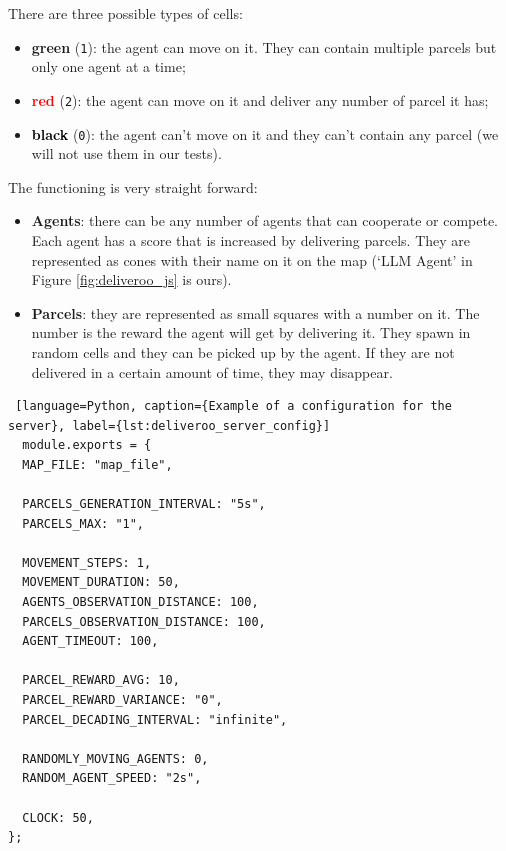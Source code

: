 There are three possible types of cells:
\begin{itemize}
  \item \textcolor{primary}{\textbf{green}} (\texttt{1}): the agent can move on
    it. They can contain multiple parcels but only one agent at a time;

  \item \textcolor{red}{\textbf{red}} (\texttt{2}): the agent can move on it and
    deliver any number of parcel it has;

  \item \textcolor{black}{\textbf{black}} (\texttt{0}): the agent can't move on
    it and they can't contain any parcel (we will not use them in our tests).
\end{itemize}

The functioning is very straight forward:

\begin{itemize}
  \item \textbf{Agents}: there can be any number of agents that can cooperate or
    compete. Each agent has a score that is increased by delivering parcels. They
    are represented as cones with their name on it on the map (`LLM Agent' in
    Figure \ref{fig:deliveroo_js} is ours).

  \item \textbf{Parcels}: they are represented as small squares with a number on
    it. The number is the reward the agent will get by delivering it. They spawn
    in random cells and they can be picked up by the agent. If they are not
    delivered in a certain amount of time, they may disappear.
\end{itemize}

\begin{lstlisting} [language=Python, caption={Example of a configuration for the server}, label={lst:deliveroo_server_config}]
  module.exports = {
  MAP_FILE: "map_file",

  PARCELS_GENERATION_INTERVAL: "5s",
  PARCELS_MAX: "1",

  MOVEMENT_STEPS: 1,
  MOVEMENT_DURATION: 50,
  AGENTS_OBSERVATION_DISTANCE: 100,
  PARCELS_OBSERVATION_DISTANCE: 100,
  AGENT_TIMEOUT: 100,

  PARCEL_REWARD_AVG: 10,
  PARCEL_REWARD_VARIANCE: "0",
  PARCEL_DECADING_INTERVAL: "infinite",

  RANDOMLY_MOVING_AGENTS: 0,
  RANDOM_AGENT_SPEED: "2s",

  CLOCK: 50,
};

\end{lstlisting}

